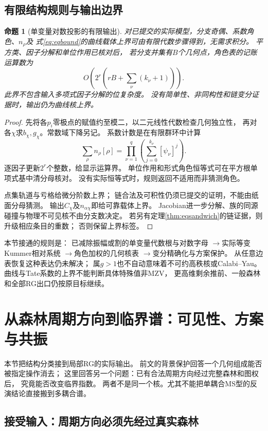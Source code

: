 \documentclass[11pt,a4paper]{ctexart}
\theoremstyle{cnplain}\newtheorem{theorem}{定理}[section]
\newtheorem{proposition}[theorem]{命题}
\theoremstyle{definition}\newtheorem{definition}[theorem]{定义}
\theoremstyle{remark}\newtheorem{remark}[theorem]{注}
\begin{document}
\subsection{有限结构规则与输出边界}
\begin{proposition}[单变量对数投影的有限输出]\label{prop:anglecompiler}
对已提交的实际模型，分支奇偶、系数角色、$n_\rho$及
式\eqref{eq:eqbound}的曲线载体上界可由有限代数步骤得到，无需求积分。
平方类、因子分解和单位作用已核对后，
若分支并集有$B$个几何点，角色表的记账运算数为
\[
 O\!\left(2^r\left(rB+\sum_\nu(k_\nu+1)\right)\right).
\]
此界不包含输入多项式因子分解的位复杂度。
没有简单性、非同构性和链变分证据时，输出仍为曲线核上界。
\end{proposition}
\begin{proof}
先将各$p_i$零极点的赋值约至模二，以二元线性代数检查几何独立性，
再对各$\chi$求$b_\chi,g_\chi$。常数域下降另记。
系数计数是在有限群环中计算
\[
 \sum_\rho n_\rho[\rho]
     =\prod_{\nu=1}^q\left(\sum_{j=0}^{k_\nu}[\psi_\nu]^j\right).
\]
逐因子更新$2^r$个整数，给显示运算界。
单位作用和形式角色恒等式可在平方根单项式基中清分母核对。
没有实际恒等式时，规则返回不适用而非猜测角色。

点集轨道与亏格给微分阶数上界；
链合法及可积性仍须已提交的证明，不能由纸面分母猜测。
输出$C_\chi$及$n_{\alpha\chi}$即给可靠载体上界。
Jacobian进一步分解、族的同源碰撞与物理不可见核不由分支数决定。
若另有定理\ref{thm:eqsandwich}的链证据，则升级相应条目的重数；
否则保留上界标签。
\end{proof}

本节接通的规则是：
已减除振幅或割的单变量代数根与对数字母
$\to$实际等变Kummer相对系统
$\to$角色加权的几何核表
$\to$变分精确化与方案保护。
从任意边表恢复这种表达仍未解决；
属$g>1$也不自动意味着不可约高秩核或Calabi--Yau。
曲线与Tate系数的上界不能判断具体特殊值非MZV，
更高维剩余推前、一般森林和全部RG出口仍按原目标继续。



\section{从森林周期方向到临界谱：可见性、方案与共振}\label{sec:criticalspectral}

本节把结构分类接到局部RG的实际输出。
前文的背景保护回答一个几何组成能否被指定操作消去；
这里回答另一个问题：已有合法周期方向经过完整森林和图权后，
究竟能否改变临界指数。
两者不是同一个核。尤其不能把单耦合MS型的反演结论直接搬到多耦合谱。

\subsection{接受输入：周期方向必须先经过真实森林}
\end{document}
